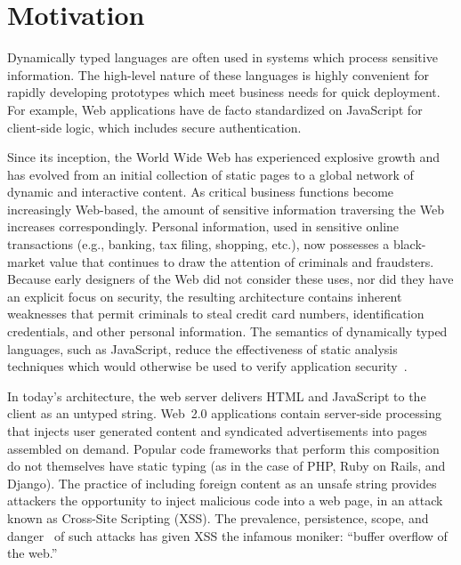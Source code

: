 \begin{comment}
\todo{categorize XSS?}
\begin{itemize}
    \item say that js handles sensitive info
    \item delineate injection
    \item categorize xss
    \item pound-include problem
    \item scare-monger prevalence as `buffer overflow'
    \item sandbox + same origin policy
    \item have to setup an attacker model?
\end{itemize}
\end{comment}

\chapter{Motivation}
\label{ch:motivation}

Dynamically typed languages are often used in systems which process sensitive information.
The high-level nature of these languages is highly convenient for rapidly developing prototypes which meet business needs for quick deployment.
For example, Web applications have de facto standardized on JavaScript for client-side logic, which includes secure authentication.

Since its inception, the World Wide Web has experienced explosive growth and has evolved from an initial collection of static pages to a global network of dynamic and interactive content.
As critical business functions become increasingly Web-based, the amount of sensitive information traversing the Web increases correspondingly.
Personal information, used in sensitive online transactions (e.g., banking, tax filing, shopping, etc.), now possesses a black-market value that continues to draw the attention of criminals and fraudsters.
Because early designers of the Web did not consider these uses, nor did they have an explicit focus on security, the resulting architecture contains inherent weaknesses that permit criminals to steal credit card numbers, identification credentials, and other personal information.
The semantics of dynamically typed languages, such as JavaScript, reduce the effectiveness of static analysis techniques which would otherwise be used to verify application security~\cite{robertson.vigna+09}.


In today's architecture, the web server delivers HTML and JavaScript to the client as an untyped string.
Web~2.0 applications contain server-side processing that injects user generated content and syndicated advertisements into pages assembled on demand.
Popular code frameworks that perform this composition do not themselves have static typing (as in the case of PHP, Ruby on Rails, and Django).
The practice of including foreign content as an unsafe string provides attackers the opportunity to inject malicious code into a web page, in an attack known as Cross-Site Scripting (XSS).
The prevalence, persistence, scope, and danger~\cite{whitehat, cwe} of such attacks has given XSS the infamous moniker: ``buffer overflow of the web.''

